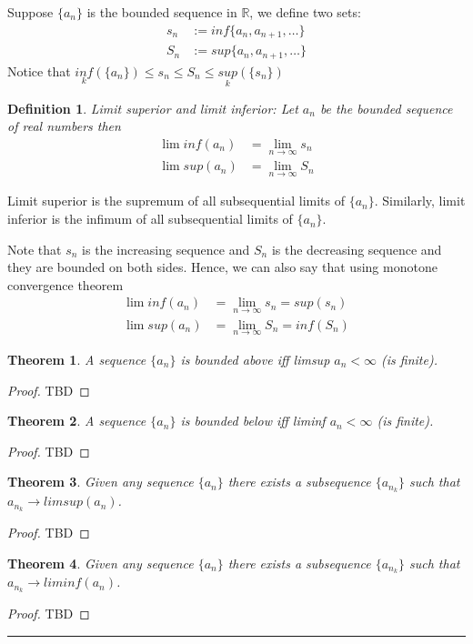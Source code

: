 \documentclass[12pt]{report}
\newtheorem{thm}{Theorem}
\newtheorem{defn}{Definition}
\begin{document}
Suppose $\{a_n\}$ is the bounded sequence in $\mathbb{R}$, we define two sets: 
\begin{align*}
    s_n &:= inf\{a_n, a_{n+1}, \dots \}\\
    S_n &:= sup\{a_n, a_{n+1}, \dots \}
\end{align*}
Notice that $ \underset{k}{inf}(\{a_n\}) \leq s_n \leq S_n \leq \underset{k}{sup}(\{s_n\})$
\begin{defn}
    Limit superior and limit inferior: Let $a_n$ be the bounded sequence of real numbers then
    \begin{align*}
        \lim inf(a_n) &= \lim_{n\to \infty} s_n\\
        \lim sup(a_n) &= \lim_{n\to \infty} S_n
    \end{align*}
\end{defn}
Limit superior is the supremum of all subsequential limits of $\{a_n\}$. Similarly, limit inferior is the infimum of all subsequential limits of $\{a_n\}$.

Note that $s_n$ is the increasing sequence and $S_n$ is the decreasing sequence and they are bounded on both sides. Hence, we can also say that using monotone convergence theorem
\begin{align*}
    \lim inf(a_n) &= \lim_{n\to \infty} s_n = sup(s_n)\\
    \lim sup(a_n) &= \lim_{n\to \infty} S_n = inf(S_n)
\end{align*}
\begin{thm}
    A sequence $\{a_n\}$ is bounded above iff limsup $a_n < \infty$ (is finite).
\end{thm}
\begin{proof}
    TBD
\end{proof}
\begin{thm}
    A sequence $\{a_n\}$ is bounded below iff liminf $a_n < \infty$ (is finite).
\end{thm}
\begin{proof}
    TBD
\end{proof}
\begin{thm}
    Given any sequence $\{a_n\}$ there exists a subsequence $\{a_{n_k}\}$ such that $a_{n_k} \to limsup(a_n)$.
\end{thm}
\begin{proof}
    TBD
\end{proof}
\begin{thm}
    Given any sequence $\{a_n\}$ there exists a subsequence $\{a_{n_k}\}$ such that $a_{n_k} \to liminf(a_n)$.
\end{thm}
\begin{proof}
    TBD
\end{proof}
\hrule
\end{document}
